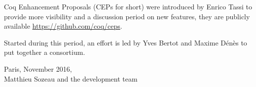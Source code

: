 Coq Enhancement Proposals (CEPs for short) were introduced by Enrico
Tassi to provide more visibility and a discussion period on new
features, they are publicly available \url{https://github.com/coq/ceps}.

Started during this period, an effort is led by Yves Bertot and Maxime
Dénès to put together a {\Coq} consortium.

\begin{flushright}
Paris, November 2016,\\
Matthieu Sozeau and the {\Coq} development team\\
\end{flushright}







